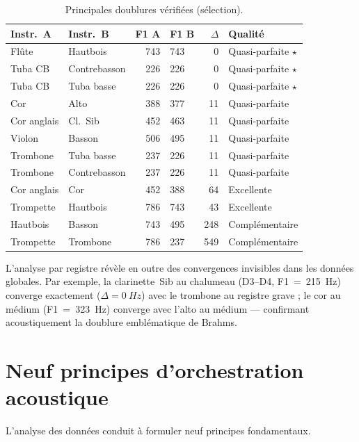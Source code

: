 \documentclass[11pt,a4paper]{article}
\begin{document}
\begin{table}[ht]
\centering
\caption{Principales doublures vérifiées (sélection).}
\label{tab:doublures}
\small
\begin{tabular}{llrlrl}
\toprule
Instr.~A & Instr.~B & F1 A & F1 B & $\Delta$ & Qualité \\
\midrule
Flûte        & Hautbois     & 743  & 743  & 0   & Quasi-parfaite $\star$ \\
Tuba CB      & Contrebasson & 226  & 226  & 0   & Quasi-parfaite $\star$ \\
Tuba CB      & Tuba basse   & 226  & 226  & 0   & Quasi-parfaite $\star$ \\
Cor          & Alto         & 388  & 377  & 11  & Quasi-parfaite \\
Cor anglais  & Cl.~Sib      & 452  & 463  & 11  & Quasi-parfaite \\
Violon       & Basson       & 506  & 495  & 11  & Quasi-parfaite \\
Trombone     & Tuba basse   & 237  & 226  & 11  & Quasi-parfaite \\
Trombone     & Contrebasson & 237  & 226  & 11  & Quasi-parfaite \\
Cor anglais  & Cor          & 452  & 388  & 64  & Excellente \\
Trompette    & Hautbois     & 786  & 743  & 43  & Excellente \\
Hautbois     & Basson       & 743  & 495  & 248 & Complémentaire \\
Trompette    & Trombone     & 786  & 237  & 549 & Complémentaire \\
\bottomrule
\end{tabular}
\end{table}

L'analyse par registre révèle en outre des convergences invisibles dans
les données globales. Par exemple, la clarinette~Sib au chalumeau (D3--D4,
F1~=~\SI{215}{Hz}) converge exactement ($\Delta = \SI{0}{Hz}$) avec le
trombone au registre grave ; le cor au médium (F1~=~\SI{323}{Hz})
converge avec l'alto au médium --- confirmant acoustiquement la doublure
emblématique de Brahms.


\section{Neuf principes d'orchestration acoustique}

L'analyse des données conduit à formuler neuf principes
fondamentaux.
\end{document}
